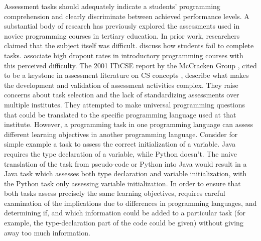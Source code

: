 Assessment tasks should adequately indicate a students' programming comprehension and clearly discriminate between achieved performance levels.
A substantial body of research has previously explored the assessments used in novice programming courses in tertiary education. In prior work, researchers claimed that the subject itself was difficult.  discuss how students fail to complete tasks.  associate high dropout rates in introductory programming courses with this perceived difficulty. The 2001 ITiCSE report by the McCracken Group \cite{McCracken2001}, cited to be a keystone in assessment literature on CS concepts \cite{Giordano2015}, describe what makes the development and validation of assessment activities complex. They raise concerns about task selection and the lack of standardizing assessments over multiple institutes. They attempted to make universal programming questions that could be translated to the specific programming language used at that institute. However, a programming task in one programming language can assess different learning objectives in another programming language. Consider for simple example a task to assess the correct initialization of a variable. Java requires the type declaration of a variable, while Python doesn't. The naive translation of the task from pseudo-code or Python into Java would result in a Java task which assesses both type declaration and variable initialization, with the Python task only assessing variable initialization.  In order to ensure that both tasks assess precisely the same learning objectives, requires careful examination of the implications due to differences in programming languages, and determining if, and which information could be added to a particular task (for example, the type-declaration part of the code could be given) without giving away too much information.

